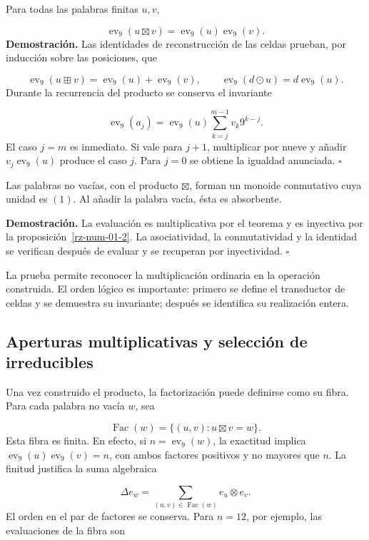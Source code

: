 Para todas las palabras finitas $u,v$,

\[
\operatorname{ev}_9(u\boxtimes v)
=\operatorname{ev}_9(u)\operatorname{ev}_9(v).
\]
\textbf{Demostración.} Las identidades de reconstrucción de las celdas prueban, por inducción sobre las posiciones, que

\[
\operatorname{ev}_9(u\boxplus v)
=\operatorname{ev}_9(u)+\operatorname{ev}_9(v),\qquad
\operatorname{ev}_9(d\odot u)=d\operatorname{ev}_9(u).
\]
Durante la recurrencia del producto se conserva el invariante

\[
\operatorname{ev}_9(a_j)
=\operatorname{ev}_9(u)\sum_{k=j}^{m-1}v_k9^{k-j}.
\]
El caso $j=m$ es inmediato. Si vale para $j+1$, multiplicar por nueve y añadir $v_j\operatorname{ev}_9(u)$ produce el caso $j$. Para $j=0$ se obtiene la igualdad anunciada. \hfill\(\square\)

Las palabras no vacías, con el producto $\boxtimes$, forman un monoide conmutativo cuya unidad es $(1)$. Al añadir la palabra vacía, ésta es absorbente.

\textbf{Demostración.} La evaluación es multiplicativa por el teorema y es inyectiva por la proposición~\ref{rz-num-01-2}. La asociatividad, la conmutatividad y la identidad se verifican después de evaluar y se recuperan por inyectividad. \hfill\(\square\)

La prueba permite reconocer la multiplicación ordinaria en la operación construida. El orden lógico es importante: primero se define el transductor de celdas y se demuestra su invariante; después se identifica su realización entera.

\subsection{Aperturas multiplicativas y selección de irreducibles}
Una vez construido el producto, la factorización puede definirse como su fibra. Para cada palabra no vacía $w$, sea

\[
\operatorname{Fac}(w)=\{(u,v):u\boxtimes v=w\}.
\]
Esta fibra es finita. En efecto, si $n=\operatorname{ev}_9(w)$, la exactitud implica $\operatorname{ev}_9(u)\operatorname{ev}_9(v)=n$, con ambos factores positivos y no mayores que $n$. La finitud justifica la suma algebraica

\[
\Delta e_w=\sum_{(u,v)\in\operatorname{Fac}(w)}e_u\otimes e_v.
\]
El orden en el par de factores se conserva. Para $n=12$, por ejemplo, las evaluaciones de la fibra son

